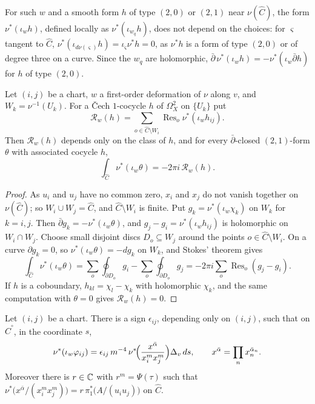 For such $w$ and a smooth form $h$ of type $(2,0)$ or $(2,1)$ near
$\nu(\widehat C)$, the form $\nu^{*}(\iota_{w}h)$, defined locally as
$\nu^{*}(\iota_{w_{q}}h)$, does not depend on the choices: for $\varsigma$
tangent to $\widehat C$, $\nu^{*}(\iota_{d\nu(\varsigma)}h)=\iota_{\varsigma}
\nu^{*}h=0$, as $\nu^{*}h$ is a form of type $(2,0)$ or of degree three on a
curve. Since the $w_{q}$ are holomorphic, $\bar\partial\,\nu^{*}(\iota_{w}h)
=-\nu^{*}(\iota_{w}\bar\partial h)$ for $h$ of type $(2,0)$.

\begin{lemma}\label{lem:tracegen}
Let $(i,j)$ be a chart, $w$ a first-order deformation of $\nu$ along $v$,
and $W_{k}=\nu^{-1}(U_{k})$. For a \v{C}ech $1$-cocycle $h$ of
$\Omega^{2}_{X}$ on $\{U_{k}\}$ put
\[
  \mathcal R_{w}(h)=\sum_{o\in\widehat C\setminus W_{i}}\operatorname{Res}_{o}
  \nu^{*}(\iota_{w}h_{ij}).
\]
Then $\mathcal R_{w}(h)$ depends only on the class of $h$, and for every
$\bar\partial$-closed $(2,1)$-form $\theta$ with associated cocycle $h$,
\[
  \int_{\widehat C}\nu^{*}(\iota_{w}\theta)=-2\pi i\,\mathcal R_{w}(h).
\]
\end{lemma}

\begin{proof}
As $u_{i}$ and $u_{j}$ have no common zero, $x_{i}$ and $x_{j}$ do not
vanish together on $\nu(\widehat C)$; so $W_{i}\cup W_{j}=\widehat C$, and
$\widehat C\setminus W_{i}$ is finite. Put $g_{k}=\nu^{*}(\iota_{w}\chi_{k})$
on $W_{k}$ for $k=i,j$. Then $\bar\partial g_{k}=-\nu^{*}(\iota_{w}\theta)$,
and $g_{j}-g_{i}=\nu^{*}(\iota_{w}h_{ij})$ is holomorphic on $W_{i}\cap
W_{j}$. Choose small disjoint discs $D_{o}\subseteq W_{j}$ around the points
$o\in\widehat C\setminus W_{i}$. On a curve $\partial g_{k}=0$, so
$\nu^{*}(\iota_{w}\theta)=-dg_{k}$ on $W_{k}$, and Stokes' theorem gives
\[
  \int_{\widehat C}\nu^{*}(\iota_{w}\theta)
  =\sum_{o}\oint_{\partial D_{o}}g_{i}-\sum_{o}\oint_{\partial D_{o}}g_{j}
  =-2\pi i\sum_{o}\operatorname{Res}_{o}(g_{j}-g_{i}).
\]
If $h$ is a coboundary, $h_{kl}=\chi_{l}-\chi_{k}$ with holomorphic
$\chi_{k}$, and the same computation with $\theta=0$ gives
$\mathcal R_{w}(h)=0$.
\end{proof}

\begin{lemma}\label{lem:contractiongen}
Let $(i,j)$ be a chart. There is a sign $\epsilon_{ij}$, depending only on
$(i,j)$, such that on $\widehat C^{\circ}$, in the coordinate $s$,
\[
  \nu^{*}(\iota_{w}\varphi_{ij})=\epsilon_{ij}\,m^{-4}\,\nu^{*}\!\Bigl(
  \frac{x^{\bar\alpha}}{x_{i}^{m}x_{j}^{m}}\Bigr)\Delta_{v}\,ds,\qquad
  x^{\bar\alpha}=\prod_{n}x_{n}^{\bar\alpha_{n}}.
\]
Moreover there is $r\in\mathbb{C}$ with $r^{m}=\Psi(\tau)$ such that
$\nu^{*}\bigl(x^{\bar\alpha}/(x_{i}^{m}x_{j}^{m})\bigr)=r\,\pi_{1}^{*}
\bigl(A/(u_{i}u_{j})\bigr)$ on $\widehat C$.
\end{lemma}

